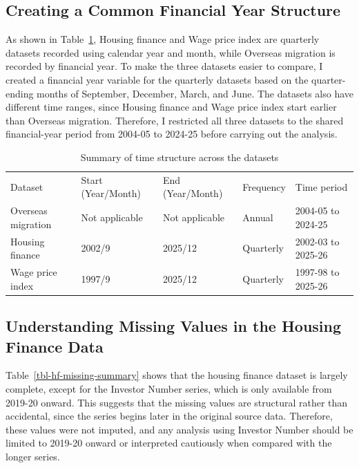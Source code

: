 \documentclass[
  11pt,
  a4paper,
]{article}
\begin{document}
\subsection{Creating a Common Financial Year
Structure}\label{creating-a-common-financial-year-structure}

As shown in Table~\ref{tbl-time-summary}, Housing finance and Wage price
index are quarterly datasets recorded using calendar year and month,
while Overseas migration is recorded by financial year. To make the
three datasets easier to compare, I created a financial year variable
for the quarterly datasets based on the quarter-ending months of
September, December, March, and June. The datasets also have different
time ranges, since Housing finance and Wage price index start earlier
than Overseas migration. Therefore, I restricted all three datasets to
the shared financial-year period from 2004-05 to 2024-25 before carrying
out the analysis.

\begin{longtable}[t]{lllll}

\caption{\label{tbl-time-summary}Summary of time structure across the
datasets}

\tabularnewline

\\
\toprule
Dataset & Start (Year/Month) & End (Year/Month) & Frequency & Time period\\
\midrule
Overseas migration & Not applicable & Not applicable & Annual & 2004-05 to 2024-25\\
Housing finance & 2002/9 & 2025/12 & Quarterly & 2002-03 to 2025-26\\
Wage price index & 1997/9 & 2025/12 & Quarterly & 1997-98 to 2025-26\\
\bottomrule

\end{longtable}

\subsection{Understanding Missing Values in the Housing Finance
Data}\label{understanding-missing-values-in-the-housing-finance-data}

Table~\ref{tbl-hf-missing-summary} shows that the housing finance
dataset is largely complete, except for the Investor Number series,
which is only available from 2019-20 onward. This suggests that the
missing values are structural rather than accidental, since the series
begins later in the original source data. Therefore, these values were
not imputed, and any analysis using Investor Number should be limited to
2019-20 onward or interpreted cautiously when compared with the longer
series.
\end{document}
